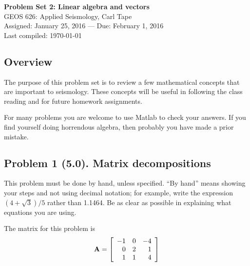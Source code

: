 \documentclass[11pt,titlepage,fleqn]{article}
\begin{document}

\begin{spacing}{1.2}
\centering
{\large \bf Problem Set 2: Linear algebra and vectors} \\
GEOS 626: Applied Seismology, Carl Tape \\
Assigned: January 25, 2016 --- Due: February 1, 2016 \\
Last compiled: \today \\
\end{spacing}


\subsection*{Overview}

The purpose of this problem set is to review a few mathematical concepts that are important to seismology. These concepts will be useful in following the class reading \citep{SteinWysession,ShearerE2} and for future homework assignments.

For many problems you are welcome to use Matlab to check your answers. If you find yourself doing horrendous algebra, then probably you have made a prior mistake.

\subsection*{Problem 1 (5.0). Matrix decompositions}

This problem must be done by hand, unless specified. ``By hand'' means showing your steps and not using decimal notation; for example, write the expression $(4 +\sqrt{3})/5$ rather than 1.1464.
Be as clear as possible in explaining what equations you are using.

\medskip\noindent
The matrix for this problem is
%
\begin{equation*}
\mbox{${\bf A}$} =  \left[ \begin{array}{rrr}
    -1  &   0  &  -4 \\
     0  &   2  &   1 \\
     1  &   1  &   4 \\
\end{array} \right]
\end{equation*}

\end{document}
